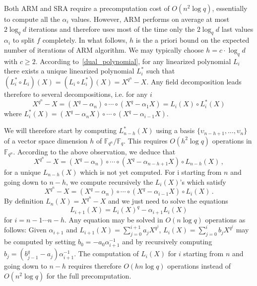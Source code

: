 \documentclass{sig-alternate}
\newcommand{\ff}[1]{\mathbb{F}_{#1}}
\newcommand{\qq}{q}
\newcommand{\nn}{n}
\newcommand{\qn}{{\qq^\nn}}
\newcommand{\basef}{\ff{\qq}}
\newcommand{\extf}{\ff{\qn}}
\newcounter{algo}
\begin{document}
\medskip



 Both ARM and SRA require a precomputation cost of $O(\nn^2 \log \qq)$, essentially to compute all the $\alpha_i$ values. However, ARM performs on average at most $2\log_\qq d$ iterations and therefore uses most of the time only the $2\log_\qq d$ last values $\alpha_i$ to split $f$ completely. In what follows, $h$ is the a priori bound on the expected number of iterations of ARM algorithm. We may typically choose $h=c \cdot \log_\qq d$ with $c \ge 2$.
According to~\eqref{dual_polynomial}, for any linearized polynomial $L_i$ there exists a unique linearized polynomial $L_i^\ast$ such that $(L_i^\ast\circ L_i)(X)=(L_i\circ L_i^\ast)(X)=X^{\qq^\nn}-X$. Any field decomposition leads therefore to several decompositions, i.e. for any $i$
$$X^{\qq^\nn}-X=(X^{\qq}-\alpha_\nn) \circ \cdots \circ (X^{\qq}-\alpha_1 X)=L_i(X) \circ L_i^\ast(X)$$
where $L_i^\ast(X)=(X^{\qq} -\alpha_n X) \circ \cdots \circ (X^{\qq}-\alpha_{i-1}X)$.

We will therefore start by computing $L_{n-h}^\ast(X)$ using a basis $\{\upsilon_{n-h+1},\ldots,\upsilon_n\}$ of a vector space dimension $h$ of $\extf/\basef$. This requires $O(h^2\log\qq)$ operations in $\extf$. According to the above observation, we deduce that
$$X^{\qq^\nn}-X=(X^{\qq}-\alpha_n) \circ \cdots \circ (X^{\qq}-\alpha_{n-h+1} X) \circ L_{n-h}(X)\,,$$
for a unique $L_{n-h}(X)$ which is not yet computed. For i starting from $\nn$ and going down to $n-h$, we compute recursively the $L_i(X)$'s which satisfy
$$X^{\qq^\nn}-X= (X^{\qq}-\alpha_n) \circ \cdots \circ (X^{\qq}-\alpha_{i-1} X) \circ L_{i}(X)\,.  $$
By definition $L_n(X)=X^{q^n}-X$ and we just need to solve the equations 
$$L_{i+1}(X)=L_i(X)^q-\alpha_{i+1}L_i(X)$$
for $i=n-1 \cdots n-h$. Any equation may be solved in $O(\nn \log q)$ operations as follows: Given $\alpha_{i+1}$ and $L_{i+1}(X)=\sum_{j=0}^{i+1}a_jX^{q^j}$, $L_i(X)=\sum_{j=0}^{i}b_jX^{q^j}$ may be computed by setting $b_0=-a_0\alpha_{i+1}^{-1}$ and by
recursively computing $b_j=(b_{j-1}^q-a_j)\alpha_{i+1}^{-1}$. The computation of $L_i(X)$ for $i$ starting from $n$ and going down to $n-h$ requires therefore $O(h \nn \log q)$ operations instead of $O(\nn^2 \log q)$ for the full precomputation.
\end{document}
